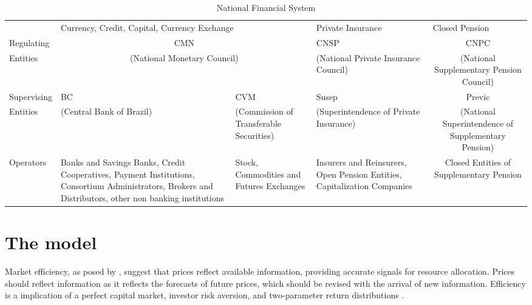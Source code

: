 \documentclass[a4paper]{article}
\begin{document}
\begin{table}[H]
\caption{National Financial System}
\label{tab:sistemanacional}
\centering
\begin{tabular}{lp{2.75cm}|p{2.75cm}|p{2.75cm}|c}
 & \multicolumn{2}{p{5.5cm}||}{Currency, Credit, Capital, Currency Exchange} & \multicolumn{1}{l||}{Private Insurance} & \multicolumn{1}{l}{Closed Pension} \\ \cline{2-5} 
\multicolumn{1}{l|}{Regulating} & \multicolumn{2}{c||}{CMN} & \multicolumn{1}{p{2.75cm}||}{CNSP} & \multicolumn{1}{p{2.75cm}|}{CNPC} \\
\multicolumn{1}{l|}{Entities} & \multicolumn{2}{c||}{(National Monetary Council)} & \multicolumn{1}{p{2.75cm}||}{(National Private Insurance Council)} & \multicolumn{1}{p{2.75cm}|}{(National Supplementary Pension Council)} \\ \hline
\multicolumn{1}{l|}{Supervising} & \multicolumn{1}{p{2.75cm}||}{BC} & \multicolumn{1}{p{2.75cm}||}{CVM} & \multicolumn{1}{p{2.75cm}||}{Susep} & \multicolumn{1}{p{2.75cm}|}{Previc} \\
\multicolumn{1}{l|}{Entities} & \multicolumn{1}{p{2.75cm}||}{(Central Bank of Brazil)} & \multicolumn{1}{p{2.75cm}||}{(Commission of Transferable Securities)} & \multicolumn{1}{p{2.75cm}||}{(Superintendence of Private Insurance)} & \multicolumn{1}{p{2.75cm}|}{(National Superintendence of Supplementary Pension)} \\ \hline
\multicolumn{1}{l|}{Operators} & \multicolumn{1}{p{2.75cm}||}{Banks and Savings Banks,  Credit Cooperatives, Payment Institutions, Consortium Administrators, Brokers and Distributors, other non banking institutions} & \multicolumn{1}{p{2.75cm}||}{Stock, Commodities and Futures Exchanges} & \multicolumn{1}{p{2.75cm}||}{Insurers and Reinsurers, Open Pension Entities, Capitalization Companies} & \multicolumn{1}{p{2.75cm}|}{Closed Entities of Supplementary Pension} \\ \cline{2-5} 
\end{tabular}
\end{table}

\section{The model}

Market efficiency, as posed by \citet{fama1970}, suggest that prices reflect available information, providing accurate signals for resource allocation. Prices should reflect information as it reflects the forecasts of future prices, which should be revised with the arrival of new information. Efficiency is a implication of a perfect capital market, investor risk aversion, and two-parameter return distributions \citet{famamcbeth1973}.
\end{document}
